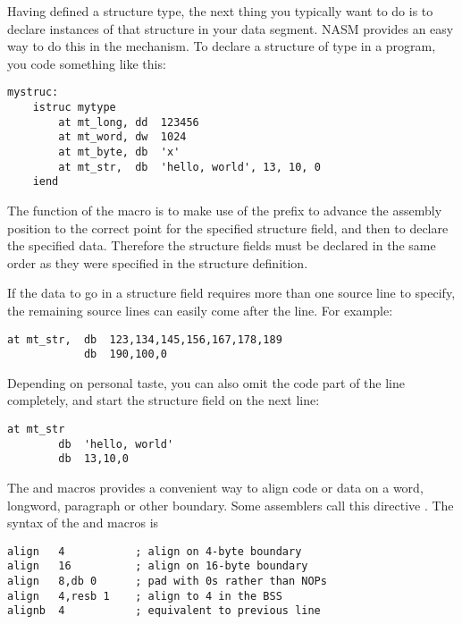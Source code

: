 
Having defined a structure type, the next thing you typically want
to do is to declare instances of that structure in your data
segment. NASM provides an easy way to do this in the 
mechanism. To declare a structure of type  in a program,
you code something like this:

\begin{lstlisting}
mystruc:
    istruc mytype
        at mt_long, dd  123456
        at mt_word, dw  1024
        at mt_byte, db  'x'
        at mt_str,  db  'hello, world', 13, 10, 0
    iend
\end{lstlisting}

The function of the  macro is to make use of the 
prefix to advance the assembly position to the correct point for the
specified structure field, and then to declare the specified data.
Therefore the structure fields must be declared in the same order as
they were specified in the structure definition.

If the data to go in a structure field requires more than one source
line to specify, the remaining source lines can easily come after
the  line. For example:

\begin{lstlisting}
at mt_str,  db  123,134,145,156,167,178,189
            db  190,100,0
\end{lstlisting}

Depending on personal taste, you can also omit the code part of the
 line completely, and start the structure field on the next
line:

\begin{lstlisting}
at mt_str
        db  'hello, world'
        db  13,10,0
\end{lstlisting}


The  and  macros provides a convenient way to
align code or data on a word, longword, paragraph or other boundary.
Some assemblers call this directive . The syntax of the
 and  macros is

\begin{lstlisting}
align   4           ; align on 4-byte boundary
align   16          ; align on 16-byte boundary
align   8,db 0      ; pad with 0s rather than NOPs
align   4,resb 1    ; align to 4 in the BSS
alignb  4           ; equivalent to previous line
\end{lstlisting}

